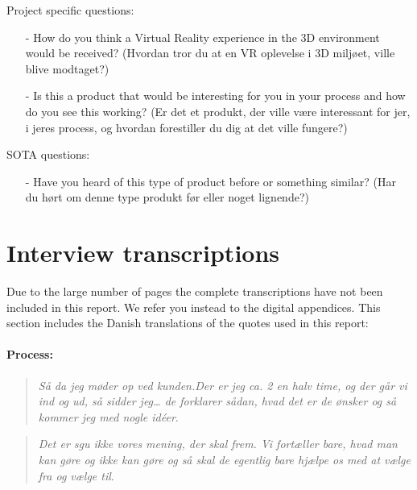 Project specific questions:
\begin{itemize}
	\item[-] How do you think a Virtual Reality experience in the 3D environment would be received? (Hvordan tror du at en VR oplevelse i 3D miljøet, ville blive modtaget?)
	\item[-] Is this a product that would be interesting for you in your process and how do you see this working? (Er det et produkt, der ville være interessant for jer, i jeres process, og hvordan forestiller du dig at det ville fungere?)\\
\end{itemize}

SOTA questions:
\begin{itemize}
	\item[-] Have you heard of this type of product before or something similar? (Har du hørt om denne type produkt før eller noget lignende?)
\end{itemize}

\section*{Interview transcriptions}\label{interviewTranscriptions}
Due to the large number of pages the complete transcriptions have not been included in this report. We refer you instead to the digital appendices. This section includes the Danish translations of the quotes used in this report:\\
\begin{comment}




\end{comment}


\paragraph*{Process:}
\begin{quote}
	\textit{Så da jeg møder op ved kunden.Der er jeg ca. 2 en halv time, og der går vi ind og ud, så sidder jeg… de forklarer sådan, hvad det er de ønsker og så kommer jeg med nogle idéer}\label{quote:expertProcess1Danish}.\\
\end{quote}

\begin{quote}
	\textit{Det er sgu ikke vores mening, der skal frem. Vi fortæller bare, hvad man kan gøre og ikke kan gøre og så skal de egentlig bare hjælpe os med at vælge fra og vælge til}\label{quote:expertProcess2Danish}.\\
\end{quote}

